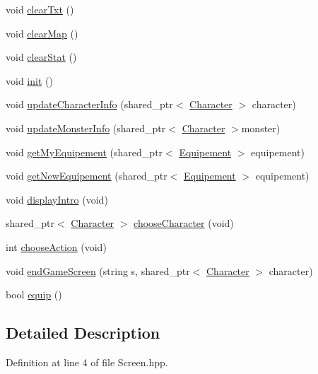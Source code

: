\begin{DoxyCompactItemize}
\item 
void \hyperlink{class_screen_a12d72e3b34a2f2929365cfc8469a4a08}{clear\-Txt} ()
\item 
void \hyperlink{class_screen_a0d2869fc5d37dcf1f57b082d779b0d09}{clear\-Map} ()
\item 
void \hyperlink{class_screen_ab28f956b587562ce75278e863601a688}{clear\-Stat} ()
\item 
void \hyperlink{class_screen_a83b1198dc25fb5134437c49bbcaf1cca}{init} ()
\item 
void \hyperlink{class_screen_a012895b484cec06cea2b0d767caef0ea}{update\-Character\-Info} (shared\-\_\-ptr$<$ \hyperlink{class_character}{Character} $>$ character)
\item 
void \hyperlink{class_screen_af6eb9e68c7d4d3fc9a1025c55be2a2fd}{update\-Monster\-Info} (shared\-\_\-ptr$<$ \hyperlink{class_character}{Character} $>$monster)
\item 
void \hyperlink{class_screen_ab5e2893c35908e6f1b225651504cd376}{get\-My\-Equipement} (shared\-\_\-ptr$<$ \hyperlink{class_equipement}{Equipement} $>$ equipement)
\item 
void \hyperlink{class_screen_ab01c4d604aef2289a0c208019ac20d3b}{get\-New\-Equipement} (shared\-\_\-ptr$<$ \hyperlink{class_equipement}{Equipement} $>$ equipement)
\item 
void \hyperlink{class_screen_a96dbbfbb850c951a6380169dc8ee3028}{display\-Intro} (void)
\item 
shared\-\_\-ptr$<$ \hyperlink{class_character}{Character} $>$ \hyperlink{class_screen_a4830273ee662309772f2e82696ae6506}{choose\-Character} (void)
\item 
int \hyperlink{class_screen_a7e9512275656994209b20cdb57d1eb6b}{choose\-Action} (void)
\item 
void \hyperlink{class_screen_a63c96078515cc7020d920d58b0a79711}{end\-Game\-Screen} (string s, shared\-\_\-ptr$<$ \hyperlink{class_character}{Character} $>$ character)
\item 
bool \hyperlink{class_screen_a2f8615c1154b9e1b81ceb5bef77bb35b}{equip} ()
\end{DoxyCompactItemize}


\subsection{Detailed Description}


Definition at line 4 of file Screen.\-hpp.




